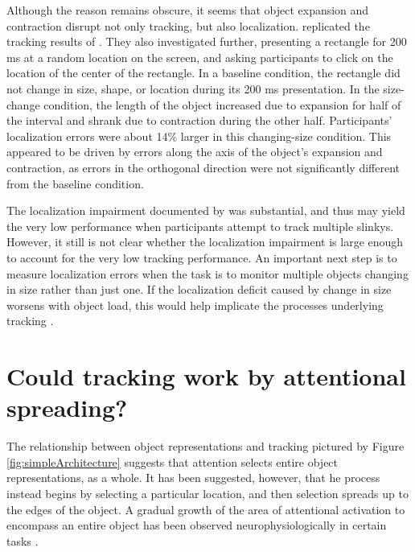\documentclass[
]{book}
\begin{document}
Although the reason remains obscure, it seems that object expansion and contraction disrupt not only tracking, but also localization. \citet{howeVisuallyTrackingLocalizing2013} replicated the tracking results of \citet{schollWhatHaveWe2008}. They also investigated further, presenting a rectangle for 200 ms at a random location on the screen, and asking participants to click on the location of the center of the rectangle. In a baseline condition, the rectangle did not change in size, shape, or location during its 200 ms presentation. In the size-change condition, the length of the object increased due to expansion for half of the interval and shrank due to contraction during the other half. Participants' localization errors were about 14\% larger in this changing-size condition. This appeared to be driven by errors along the axis of the object's expansion and contraction, as errors in the orthogonal direction were not significantly different from the baseline condition.

The localization impairment documented by \citet{howeVisuallyTrackingLocalizing2013} was substantial, and thus may yield the very low performance when participants attempt to track multiple slinkys. However, it still is not clear whether the localization impairment is large enough to account for the very low tracking performance. An important next step is to measure localization errors when the task is to monitor multiple objects changing in size rather than just one. If the localization deficit caused by change in size worsens with object load, this would help implicate the processes underlying tracking .

\hypertarget{could-tracking-work-by-attentional-spreading}{%
\section{Could tracking work by attentional spreading?}\label{could-tracking-work-by-attentional-spreading}}

The relationship between object representations and tracking pictured by Figure \ref{fig:simpleArchitecture} suggests that attention selects entire object representations, as a whole. It has been suggested, however, that he process instead begins by selecting a particular location, and then selection spreads up to the edges of the object. A gradual growth of the area of attentional activation to encompass an entire object has been observed neurophysiologically in certain tasks \citep[e.g.,][]{wannigAutomaticSpreadAttentional2011}.
\end{document}
